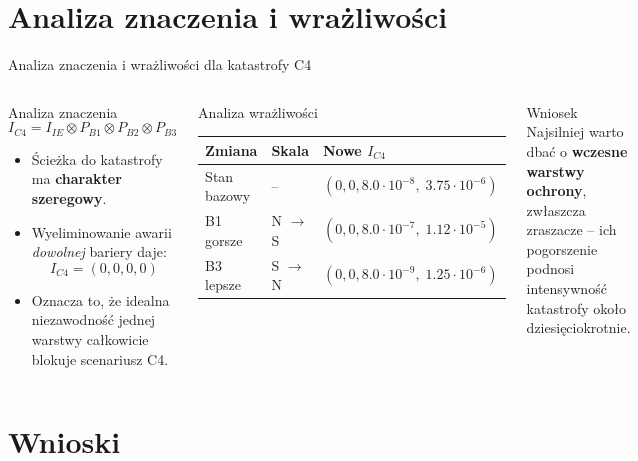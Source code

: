 \documentclass[aspectratio=169,11pt]{beamer}
\begin{document}
\section{Analiza znaczenia i wrażliwości}
\begin{frame}{Analiza znaczenia i wrażliwości dla katastrofy C4}
\small
\begin{columns}[T,totalwidth=\textwidth]
\begin{block}{Analiza znaczenia}
\[
I_{C4}=I_{IE}\otimes P_{B1}\otimes P_{B2}\otimes P_{B3}
\]
\begin{itemize}
  \item Ścieżka do katastrofy ma \textbf{charakter szeregowy}.
  \item Wyeliminowanie awarii \emph{dowolnej} bariery daje:
  \[
  I_{C4}= (0,0,0,0)
  \]
  \item Oznacza to, że idealna niezawodność jednej warstwy całkowicie blokuje scenariusz C4.
\end{itemize}
\end{block}

\begin{block}{Analiza wrażliwości}
\centering
\scriptsize
\begin{tabular}{>{\raggedright\arraybackslash}p{1.7cm}>{\centering\arraybackslash}p{1.2cm}>{\raggedright\arraybackslash}p{3.2cm}}
\toprule
\textbf{Zmiana} & \textbf{Skala} & \textbf{Nowe $I_{C4}$} \\
\midrule
Stan bazowy & -- & $\left(0,0,8.0\cdot10^{-8},\;3.75\cdot10^{-6}\right)$ \\
B1 gorsze & N $\to$ S & $\left(0,0,8.0\cdot10^{-7},\;1.12\cdot10^{-5}\right)$ \\
B3 lepsze & S $\to$ N & $\left(0,0,8.0\cdot10^{-9},\;1.25\cdot10^{-6}\right)$ \\
\bottomrule
\end{tabular}
\end{block}

\vspace{0.1cm}
\begin{alertblock}{Wniosek}
Najsilniej warto dbać o \textbf{wczesne warstwy ochrony}, zwłaszcza zraszacze -- ich pogorszenie podnosi intensywność katastrofy około dziesięciokrotnie.
\end{alertblock}
\end{columns}
\end{frame}

\section{Wnioski}
\end{document}
